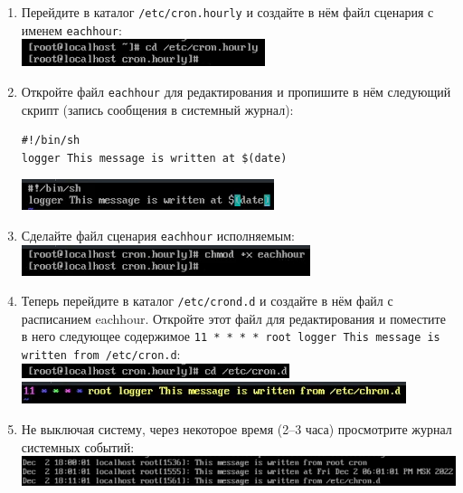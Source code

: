 \documentclass[12pt]{article}
\begin{document}
\begin{enumerate}
	\item Перейдите в каталог \texttt{/etc/cron.hourly} и создайте в нём файл сценария с именем \texttt{eachhour}:
	      \\\includegraphics{8.png}
	\item Откройте файл \texttt{eachhour} для редактирования и пропишите в нём следующий скрипт (запись сообщения в системный журнал):
	      \begin{verbatim}
#!/bin/sh
logger This message is written at $(date)
        \end{verbatim}
	      \includegraphics{9.png}
	\item Сделайте файл сценария \texttt{eachhour} исполняемым:
	      \\\includegraphics{10.png}
	\item Теперь перейдите в каталог \texttt{/etc/crond.d} и создайте в нём файл с расписанием eachhour. Откройте этот файл для редактирования и поместите в него следующее содержимое \texttt{11 * * * * root logger This message is written from /etc/cron.d}:
	      \\\includegraphics{11.png}
	      \\\includegraphics{12.png}
	\item Не выключая систему, через некоторое время (2–3 часа) просмотрите журнал системных событий:
	      \\\includegraphics{13.png}

\end{enumerate}
\end{document}
